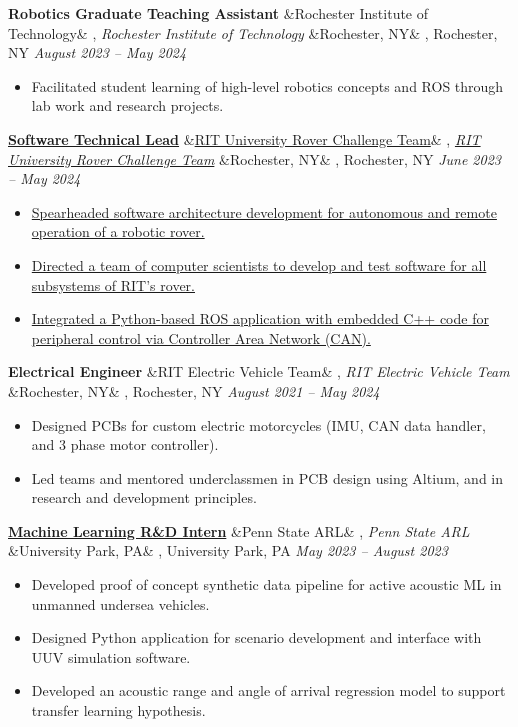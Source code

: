 \documentclass[letterpaper,10pt]{article}
\newcommand{\experience}[5]{%
    \vspace{-1mm}%
    \noindent\textbf{#1}%
    \ifx&#2&
    \else
        , \textit{#2}%
    \fi
    \ifx&#3&
    \else
        , #3%
    \fi
    \hfill \textit{#4} \\
    \vspace{-6.8mm}%
    \begin{itemize}[itemsep=-5pt]
        \setlength{\itemindent}{0em}
        #5
    \end{itemize}
}
\begin{document}
\experience
    {Robotics Graduate Teaching Assistant}
    {Rochester Institute of Technology}
    {Rochester, NY}
    {August 2023 – May 2024}
    {
        \item  Facilitated student learning of high-level robotics concepts and ROS through lab work and research projects.
    }

\experience
    {\href{https://github.com/ryan-barry-99/rovers}{Software Technical Lead}}
    {\href{https://github.com/ryan-barry-99/rovers}{RIT University Rover Challenge Team}}
    {Rochester, NY}
    {June 2023 – May 2024}
    {
        \item \href{https://github.com/ryan-barry-99/rovers}{Spearheaded software architecture development for autonomous and remote operation of a robotic rover.}

        \item \href{https://github.com/ryan-barry-99/rovers}{Directed a team of computer scientists to develop and test software for all subsystems of RIT’s rover.}

        \item \href{https://github.com/ryan-barry-99/rovers}{Integrated a Python-based ROS application with embedded C++ code for peripheral control via Controller Area Network (CAN).}
    }

\experience
    {Electrical Engineer}
    {RIT Electric Vehicle Team}
    {Rochester, NY}
    {August 2021 – May 2024}
    {
        \item Designed PCBs for custom electric motorcycles (IMU, CAN data handler, and 3 phase motor controller).

        \item Led teams and mentored underclassmen in PCB design using Altium, and in research and development principles.

    }

\experience
    {\href{https://ryanbarry.me/projects/ai-ml/sonar-data-pipeline/}{Machine Learning R\&D Intern}}
    {Penn State ARL}
    {University Park, PA}
    {May 2023 – August 2023}
    {
        \item Developed proof of concept synthetic data pipeline for active acoustic ML in unmanned undersea vehicles.

        \item Designed Python application for scenario development and interface with UUV simulation software.

        \item Developed an acoustic range and angle of arrival regression model to support transfer learning hypothesis.
    }
\end{document}
